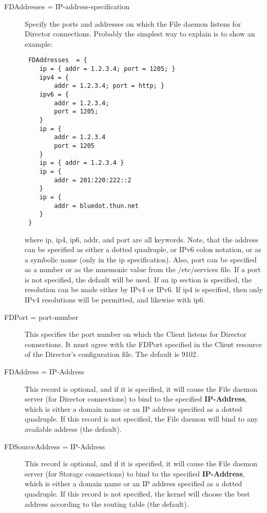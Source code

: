 \begin{description}
\item [FDAddresses = \lt{}IP-address-specification\gt{}]
   Specify the ports and addresses on which the File daemon listens for
   Director connections.  Probably the simplest way to explain is to show
   an example:

\footnotesize
\begin{verbatim}
 FDAddresses  = { 
    ip = { addr = 1.2.3.4; port = 1205; }
    ipv4 = {
        addr = 1.2.3.4; port = http; }
    ipv6 = {
        addr = 1.2.3.4;
        port = 1205;
    }
    ip = {
        addr = 1.2.3.4
        port = 1205
    }
    ip = { addr = 1.2.3.4 }
    ip = {
        addr = 201:220:222::2
    }
    ip = {
        addr = bluedot.thun.net
    }
 }
\end{verbatim}
\normalsize

where ip, ip4, ip6, addr, and port are all keywords. Note, that  the address
can be specified as either a dotted quadruple, or  IPv6 colon notation, or as
a symbolic name (only in the ip specification).  Also, port can be specified
as a number or as the mnemonic value from  the /etc/services file.  If a port
is not specified, the default will be used. If an ip  section is specified,
the resolution can be made either by IPv4 or  IPv6. If ip4 is specified, then
only IPv4 resolutions will be permitted,  and likewise with ip6.  

\item [FDPort = \lt{}port-number\gt{}]
   This specifies the port number  on which the Client listens for Director
   connections. It must agree  with the FDPort specified in the Client resource
   of the Director's  configuration file. The default is 9102. 

\item [FDAddress = \lt{}IP-Address\gt{}]
   This record is optional,  and if it is specified, it will cause the File
   daemon server (for  Director connections) to bind to the specified {\bf
   IP-Address},  which is either a domain name or an IP address specified as a 
   dotted quadruple. If this record is not specified, the File daemon  will bind
   to any available address (the default). 

\item [FDSourceAddress = \lt{}IP-Address\gt{}]
   This record is optional,  and if it is specified, it will cause the File
   daemon server (for  Storage connections) to bind to the specified {\bf
   IP-Address},  which is either a domain name or an IP address specified as a
   dotted quadruple. If this record is not specified, the kernel will choose 
   the best address according to the routing table (the default).


\end{description}
